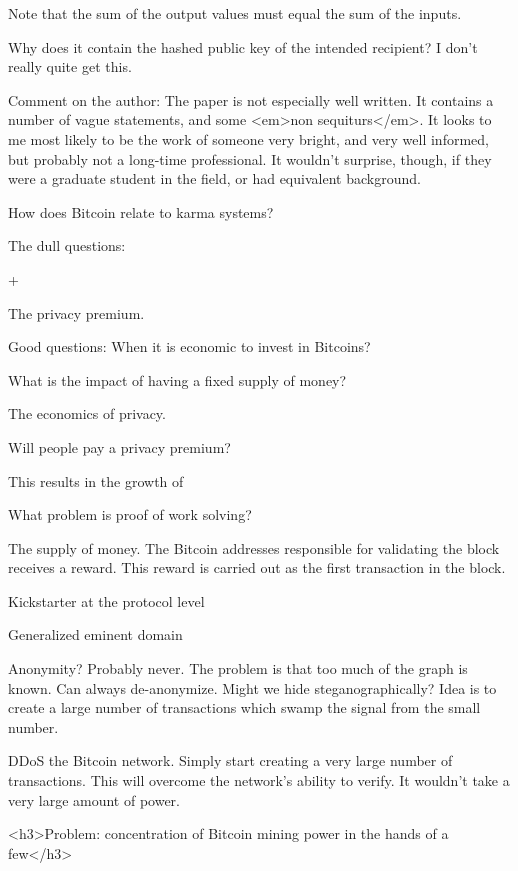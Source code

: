 Note that the sum of the output values must equal the sum of the
inputs.

Why does it contain the hashed public key of the intended recipient?
I don't really quite get this.


Comment on the author: The paper is not especially well written.  It
contains a number of vague statements, and some <em>non
sequiturs</em>.  It looks to me most likely to be the work of someone
very bright, and very well informed, but probably not a long-time
professional.  It wouldn't surprise, though, if they were a graduate
student in the field, or had equivalent background.




How does Bitcoin relate to karma systems?


The dull questions:

+

The privacy premium.




Good questions: When it is economic to invest in Bitcoins?

What is the impact of having a fixed supply of money?


The economics of privacy.  

Will people pay a privacy premium?




This results in the growth of



What problem is proof of work solving?


The supply of money.  The Bitcoin addresses responsible for validating
the block receives a reward.  This reward is carried out as the first
transaction in the block.




Kickstarter at the protocol level


Generalized eminent domain


Anonymity?  Probably never.  The problem is that too much of the graph
is known.  Can always de-anonymize.  Might we hide steganographically?
Idea is to create a large number of transactions which swamp the
signal from the small number.

DDoS the Bitcoin network.  Simply start creating a very large number
of transactions.  This will overcome the network's ability to verify.
It wouldn't take a very large amount of power.



<h3>Problem: concentration of Bitcoin mining power in the hands of a
few</h3>

